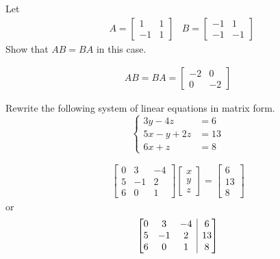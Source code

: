 \begin{Exercise}
Let 
\begin{align*}
& A =
\begin{bmatrix}
1 & 1 \\
-1 & 1
\end{bmatrix}
& B =
\begin{bmatrix}
-1 & 1 \\
-1 & -1
\end{bmatrix}
\end{align*}
Show that $AB = BA$ in this case.
\end{Exercise}
\begin{Answer}
\begin{align*}
AB = BA = \begin{bmatrix}
-2 & 0 \\
0 & -2
\end{bmatrix} 
\end{align*}
\end{Answer}

\begin{Exercise}
Rewrite the following system of linear equations in matrix form.
\begin{equation*}
\begin{cases}
3y - 4z &= 6\\
5x - y + 2z &= 13\\
6x + z &= 8
\end{cases}
\end{equation*}
\end{Exercise}
\begin{Answer}
\begin{align*}
\begin{bmatrix}
0 & 3 & -4 \\
5 & -1 & 2 \\
6 & 0 & 1
\end{bmatrix}
\begin{bmatrix}
x \\
y \\
z
\end{bmatrix}
=
\begin{bmatrix}
6 \\ 
13 \\
8
\end{bmatrix}    
\end{align*}
or
\begin{align*}
\left[\begin{array}{@{}ccc|c@{}}
0 & 3 & -4 & 6 \\
5 & -1 & 2 & 13 \\
6 & 0 & 1 & 8
\end{array}\right]    
\end{align*}
\end{Answer}

